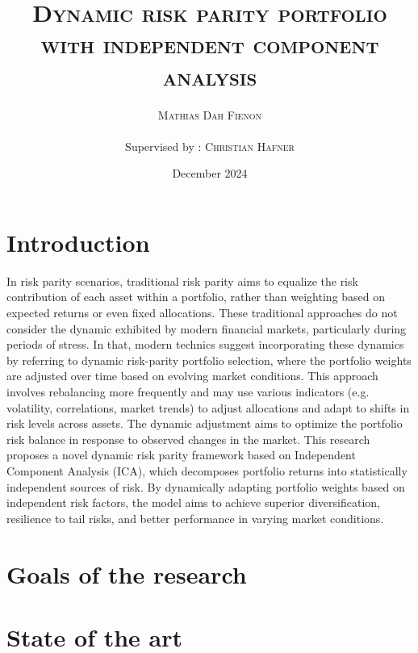 \documentclass{article}
\title{\textsc{Dynamic risk parity portfolio with independent component analysis}}
\author{\textsc{Mathias Dah Fienon} \\ \\  Supervised by : \textsc{Christian Hafner}}
\date{December 2024}
\begin{document}
\maketitle

\section*{Introduction}

In risk parity scenarios, traditional risk parity aims to equalize the risk contribution of each asset within a portfolio, rather than weighting based on expected returns or even fixed allocations. These traditional approaches do not consider the dynamic exhibited by modern financial markets, particularly during periods of stress. In that, modern technics suggest incorporating these dynamics by referring to dynamic risk-parity portfolio selection, where the portfolio weights are adjusted over time based on evolving market conditions. This approach involves rebalancing more frequently and may use various indicators (e.g. volatility, correlations, market trends) to adjust allocations and adapt to shifts in risk levels across assets. The dynamic adjustment aims to optimize the portfolio risk balance in response to observed changes in the market.
This research proposes a novel dynamic risk parity framework based on Independent Component Analysis (ICA), which decomposes portfolio returns into statistically independent sources of risk. By dynamically adapting portfolio weights based on independent risk factors, the model aims to achieve superior diversification, resilience to tail risks, and better performance in varying market conditions.

\section*{Goals of the research}
\section*{State of the art}
\end{document}
